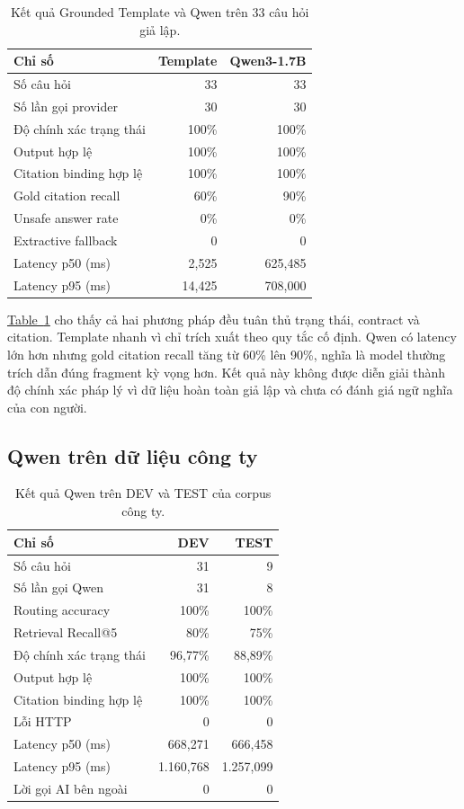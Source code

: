 \documentclass[runningheads]{llncs}
\newcommand{\tableref}[1]{\hyperref[#1]{Table~\ref*{#1}}}
\begin{document}
\begin{table}[t]
\centering
\small
\setlength{\tabcolsep}{4.5pt}
\begin{tabular}{@{}lrr@{}}
\toprule
\textbf{Chỉ số} & \textbf{Template} & \textbf{Qwen3-1.7B}\\
\midrule
Số câu hỏi & 33 & 33\\
Số lần gọi provider & 30 & 30\\
Độ chính xác trạng thái & 100\% & 100\%\\
Output hợp lệ & 100\% & 100\%\\
Citation binding hợp lệ & 100\% & 100\%\\
Gold citation recall & 60\% & 90\%\\
Unsafe answer rate & 0\% & 0\%\\
Extractive fallback & 0 & 0\\
Latency p50 (ms) & 2,525 & 625,485\\
Latency p95 (ms) & 14,425 & 708,000\\
\bottomrule
\end{tabular}
\caption{Kết quả Grounded Template và Qwen trên 33 câu hỏi giả lập.}
\label{tab:g2-comparison}
\end{table}

\tableref{tab:g2-comparison} cho thấy cả hai phương pháp đều tuân thủ trạng thái,
contract và citation. Template nhanh vì chỉ trích xuất theo quy tắc cố định. Qwen
có latency lớn hơn nhưng gold citation recall tăng từ 60\% lên 90\%, nghĩa là
model thường trích dẫn đúng fragment kỳ vọng hơn. Kết quả này không được diễn
giải thành độ chính xác pháp lý vì dữ liệu hoàn toàn giả lập và chưa có đánh giá
ngữ nghĩa của con người.

\subsection{Qwen trên dữ liệu công ty}

\begin{table}[t]
\centering
\small
\setlength{\tabcolsep}{5pt}
\begin{tabular}{@{}lrr@{}}
\toprule
\textbf{Chỉ số} & \textbf{DEV} & \textbf{TEST}\\
\midrule
Số câu hỏi & 31 & 9\\
Số lần gọi Qwen & 31 & 8\\
Routing accuracy & 100\% & 100\%\\
Retrieval Recall@5 & 80\% & 75\%\\
Độ chính xác trạng thái & 96,77\% & 88,89\%\\
Output hợp lệ & 100\% & 100\%\\
Citation binding hợp lệ & 100\% & 100\%\\
Lỗi HTTP & 0 & 0\\
Latency p50 (ms) & 668,271 & 666,458\\
Latency p95 (ms) & 1.160,768 & 1.257,099\\
Lời gọi AI bên ngoài & 0 & 0\\
\bottomrule
\end{tabular}
\caption{Kết quả Qwen trên DEV và TEST của corpus công ty.}
\label{tab:g3-results}
\end{table}
\end{document}
